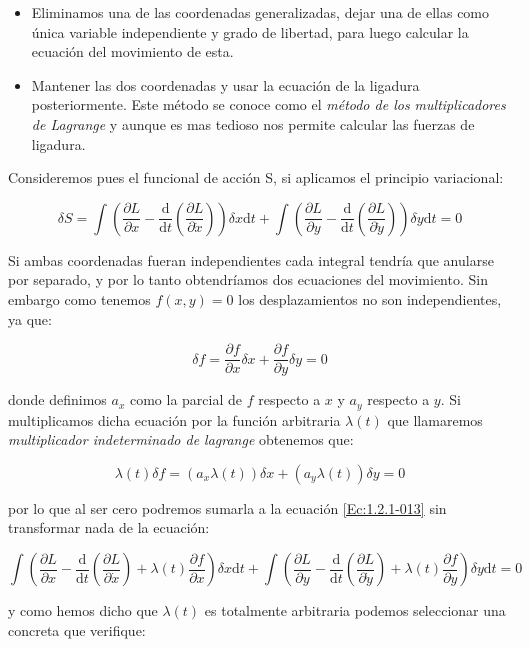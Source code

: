 \documentclass[12pt,a4paper]{book}
\newcommand{\parentesis}[1]{\left( #1  \right)}
\newcommand{\parciales}[2]{\frac{\partial #1}{\partial #2}}
\newcommand{\D}{\mathrm{d}}
\begin{document}
\begin{itemize}
\item Eliminamos una de las coordenadas generalizadas, dejar una de ellas como única variable independiente y grado de libertad, para luego calcular la ecuación del movimiento de esta.

\item Mantener las dos coordenadas y usar la ecuación de la ligadura posteriormente. Este método se conoce como el \textit{método de los multiplicadores de Lagrange} y aunque es mas tedioso nos permite calcular las fuerzas de ligadura.
\end{itemize} 

Consideremos pues el funcional de acción S, si aplicamos el principio variacional:

\begin{equation}
\delta S = \int \parentesis{\parciales{L}{x} - \dfrac{\D}{\D t} \parentesis{\parciales{L}{\dot{x}}}} \delta x \D t + \int \parentesis{\parciales{L}{y} - \dfrac{\D}{\D t} \parentesis{\parciales{L}{\dot{y}}}} \delta y \D t = 0 \label{Ec:1.2.1-013}
\end{equation}

Si ambas coordenadas fueran independientes cada integral tendría que anularse por separado, y por lo tanto obtendríamos dos ecuaciones del movimiento. Sin embargo como tenemos $f(x,y)=0$ los desplazamientos no son independientes, ya que:

\begin{equation}
\delta f = \parciales{f}{x} \delta x + \parciales{f}{y} \delta y = 0
\end{equation}

donde definimos $a_x$ como la parcial de $f$ respecto a $x$ y $a_y$ respecto a $y$. Si multiplicamos dicha ecuación por la función arbitraria $\lambda (t)$ que llamaremos \textit{multiplicador indeterminado de lagrange} obtenemos que:

$$ \lambda (t) \delta f = (a_x \lambda (t)) \delta x + (a_y \lambda (t)) \delta y  = 0 $$

por lo que al ser cero podremos sumarla a la ecuación \ref{Ec:1.2.1-013} sin transformar nada de la ecuación:

$$ \int \parentesis{\parciales{L}{x} - \dfrac{\D}{\D t} \parentesis{\parciales{L}{\dot{x}}} + \lambda(t) \parciales{f}{x}} \delta x \D t + \int \parentesis{\parciales{L}{y} - \dfrac{\D}{\D t} \parentesis{\parciales{L}{\dot{y}}} + \lambda(t) \parciales{f}{y}} \delta y \D t = 0 $$

y como hemos dicho que $\lambda(t)$ es totalmente arbitraria podemos seleccionar una concreta que verifique:
\end{document}
